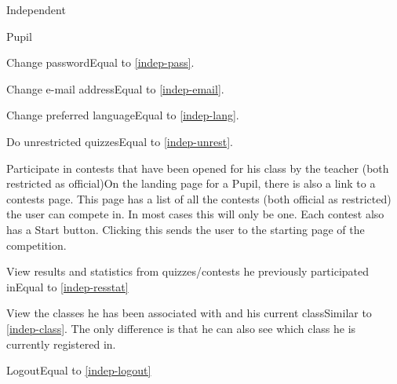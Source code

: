 \begin{section}{Independent}
    \end{section}
    

\begin{section}{Pupil}

    \begin{subsection}{Change password}Equal to \ref{indep-pass}.\end{subsection}
    \begin{subsection}{Change e-mail address}Equal to \ref{indep-email}.\end{subsection}
    \begin{subsection}{Change preferred language}Equal to \ref{indep-lang}.\end{subsection}
    \begin{subsection}{Do unrestricted quizzes}Equal to \ref{indep-unrest}.\end{subsection}
    \begin{subsection}{Participate in contests that have been opened for his class by the teacher (both restricted as official)}On the landing page for a Pupil, there is also a link to a contests page. This page has a list of all the contests (both official as restricted) the user can compete in. In most cases this will only be one. Each contest also has a Start button. Clicking this sends the user to the starting page of the competition.\end{subsection}
    \begin{subsection}{View results and statistics from quizzes/contests he previously participated in}Equal to \ref{indep-resstat}\end{subsection}
    \begin{subsection}{View the classes he has been associated with and his current class}Similar to \ref{indep-class}. The only difference is that he can also see which class he is currently registered in.\end{subsection}
	\begin{subsection}{Logout}Equal to \ref{indep-logout}\end{subsection}

\end{section}